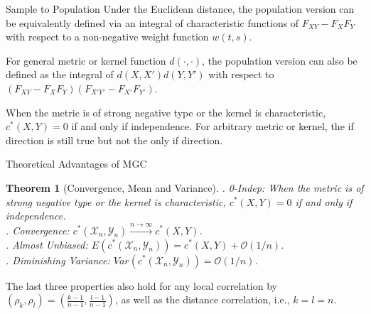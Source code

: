 \documentclass[mathserif,t]{beamer}
\newtheorem{thm}{Theorem}
\newcommand{\Mgc}{MGC}
\newcommand{\mbx}{X}
\newcommand{\mby}{Y}
\begin{document}
\begin{frame}{Sample to Population}
\pause
Under the Euclidean distance, the population version can be equivalently defined via an integral of characteristic functions of $F_{XY}-F_{X}F_{Y}$ with respect to a non-negative weight function $w(t,s)$.
\pause 
\medskip

For general metric or kernel function $d(\cdot,\cdot)$, the population version can also be defined as the integral of $d(X,X')d(Y,Y')$ with respect to $(F_{XY}-F_{X}F_{Y})(F_{X'Y'}-F_{X'}F_{Y'})$.
\pause
\medskip

When the metric is of strong negative type or the kernel is characteristic, $c^{*}(X,Y)=0$ if and only if independence. For arbitrary metric or kernel, the if direction is still true but not the only if direction.
\end{frame}

\begin{frame}{Theoretical Advantages of \Mgc}
\begin{thm}[Convergence, Mean and Variance]
. 0-Indep: When the metric is of strong negative type or the kernel is characteristic, $c^{*}(X,Y) =0$ if and only if independence.\\
\pause
{}. Convergence: $c^{*}(\mathcal{X}_{n},\mathcal{Y}_{n}) \stackrel{n \rightarrow \infty}{\rightarrow} c^{*}(X,Y)$.\\
\pause
{}. Almost Unbiased: $E(c^{*}(\mathcal{X}_{n},\mathcal{Y}_{n})) =c^{*}(X,Y)+\mathcal{O}(1/n)$.\\
\pause
{}. Diminishing Variance: $Var(c^{*}(\mathcal{X}_{n},\mathcal{Y}_{n})) =\mathcal{O}(1/n)$.\\
\end{thm}
\pause
\medskip
The last three properties also hold for any local correlation by $(\rho_{k},\rho_{l})=(\frac{k-1}{n-1},\frac{l-1}{n-1})$, as well as the distance correlation, i.e., $k=l=n$.
\end{frame}
\end{document}
